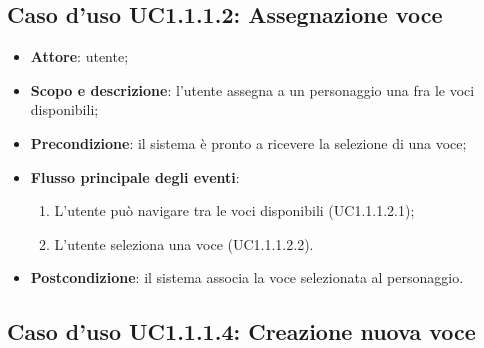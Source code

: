 \subsection{Caso d'uso UC1.1.1.2: Assegnazione voce}
\label{sec:UC1.1.1.2}
\begin{itemize}
\item \textbf{Attore}: utente;
\item \textbf{Scopo e descrizione}: l'utente assegna a un personaggio una fra le voci disponibili; 
\item \textbf{Precondizione}: il sistema è pronto a ricevere la selezione di una voce;
\item \textbf{Flusso principale degli eventi}:
\begin{enumerate}
\item L'utente può navigare tra le voci disponibili (UC1.1.1.2.1);
\item L'utente seleziona una voce (UC1.1.1.2.2).
\end{enumerate}
\item \textbf{Postcondizione}: il sistema associa la voce selezionata al personaggio.
\end{itemize}

\subsection{Caso d'uso UC1.1.1.4: Creazione nuova voce}
\label{sec:UC1.1.1.4}

